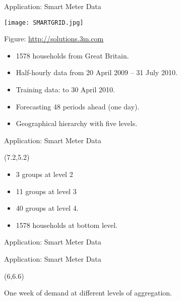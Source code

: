 \documentclass[14pt]{beamer}
\begin{document}
\begin{frame}{Application: Smart Meter Data}

\centerline{\texttt{[image: SMARTGRID.jpg]} }
  \vspace{-.85cm}
  \begin{flushright}
    { \tiny Figure: \url{http://solutions.3m.com}}
  \end{flushright}\vspace*{-0.5cm}\fontsize{12}{13}\sf

\begin{itemize}
  \item 1578 households from Great Britain.
  \item Half-hourly data from 20 April 2009 -- 31 July 2010.
  \item Training data: to 30 April 2010.
  \item Forecasting 48 periods ahead (one day).
  \item Geographical hierarchy with five levels.
\end{itemize}

\end{frame}

\begin{frame}{Application: Smart Meter Data}
\begin{textblock}{5.1}(7.2,5.2)
\begin{block}{}
\begin{itemize}
  \item 3 groups at level 2
  \item 11 groups at level 3
  \item 40 groups at level 4.
  \item 1578 households at bottom level.
\end{itemize}
\end{block}
\end{textblock}
\end{frame}

\begin{frame}{Application: Smart Meter Data}
\end{frame}

\begin{frame}{Application: Smart Meter Data}
\begin{textblock}{5}(6,6.6)
\begin{block}{}
One week of demand at different levels of aggregation.
\end{block}
\end{textblock}
\end{frame}
\end{document}
